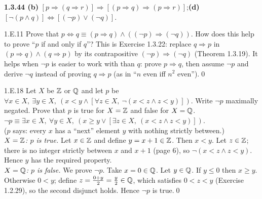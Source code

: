 \begin{trybox}[{1.3.44 (b), (d) \fO}]
\textbf{1.3.44 (b)} $[p\Rightarrow(q\Rightarrow r)]\Rightarrow[(p\Rightarrow q)\Rightarrow(p\Rightarrow r)]$;\quad \textbf{(d)} $[\neg(p\wedge q)]\Leftrightarrow[(\neg p)\vee(\neg q)]$.
\end{trybox}


\begin{bookex}[recommended]{1.E.11}
Prove that $p\Leftrightarrow q\equiv(p\Rightarrow q)\wedge((\neg p)\Rightarrow(\neg q))$. How does this help to prove ``$p$ if and only if $q$''?
\solution
This is Exercise 1.3.22: replace $q\Rightarrow p$ in $(p\Rightarrow q)\wedge(q\Rightarrow p)$ by its contrapositive $(\neg p)\Rightarrow(\neg q)$ (Theorem 1.3.19). It helps when $\neg p$ is easier to work with than $q$: prove $p\Rightarrow q$, then assume $\neg p$ and derive $\neg q$ instead of proving $q\Rightarrow p$ (as in ``$n$ even iff $n^2$ even'').\qed
\end{bookex}

\begin{bookex}[essential]{1.E.18}
Let $X$ be $\mathbb{Z}$ or $\mathbb{Q}$ and let $p$ be $\forall x\in X,\ \exists y\in X,\ (x<y\wedge[\forall z\in X,\ \neg(x<z\wedge z<y)])$. Write $\neg p$ maximally negated. Prove that $p$ is true for $X=\mathbb{Z}$ and false for $X=\mathbb{Q}$.
\solution
$\neg p\equiv\exists x\in X,\ \forall y\in X,\ (x\ge y\vee[\exists z\in X,\ (x<z\wedge z<y)])$. \\
($p$ says: every $x$ has a ``next'' element $y$ with nothing strictly between.)\\
\emph{$X=\mathbb{Z}$: $p$ is true.} Let $x\in\mathbb{Z}$ and define $y=x+1\in\mathbb{Z}$. Then $x<y$. Let $z\in\mathbb{Z}$; there is no integer strictly between $x$ and $x+1$ (page 6), so $\neg(x<z\wedge z<y)$. Hence $y$ has the required property.\\
\emph{$X=\mathbb{Q}$: $p$ is false.} We prove $\neg p$. Take $x=0\in\mathbb{Q}$. Let $y\in\mathbb{Q}$. If $y\le0$ then $x\ge y$. Otherwise $0<y$; define $z=\frac{0+y}2=\frac y2\in\mathbb{Q}$, which satisfies $0<z<y$ (Exercise 1.2.29), so the second disjunct holds. Hence $\neg p$ is true.\qed
\end{bookex}

